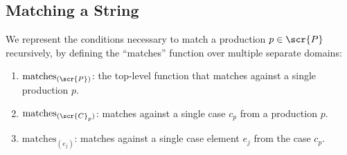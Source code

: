 \documentclass[10pt]{article}
\newcommand{\generalsubseq}{\overbar{I}}
\newcommand{\canonicalleftend}{l_1}
\newcommand{\canonicalbookmarkindex}{l^+}
\begin{document}

\subsection{Matching a String}
\label{sec:matching-a-string}
We represent the conditions necessary to match a production $p \in \scr{P}$ recursively, by defining the ``matches'' function over multiple separate domains:
\begin{enumerate}
  \item $\text{matches}_{(\scr{P})}$: the top-level function that matches against a single production $p$.
  \item $\text{matches}_{(\scr{C}_p)}$: matches against a single case $c_p$ from a production $p$.
  \item $\text{matches}_{(e_j)}$: matches against a single case element $e_j$ from the case $c_p$.
\end{enumerate}
\end{document}
